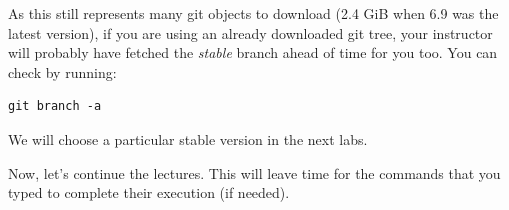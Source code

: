 As this still represents many git objects to download (2.4 GiB when 6.9 was
the latest version), if you are using an already downloaded git tree,
your instructor will probably have fetched the {\em stable} branch ahead
of time for you too. You can check by running:

\begin{verbatim}
git branch -a
\end{verbatim}

\if{}
\fi

We will choose a particular stable version
in the next labs.

Now, let's continue the lectures. This will leave time for the commands
that you typed to complete their execution (if needed).
